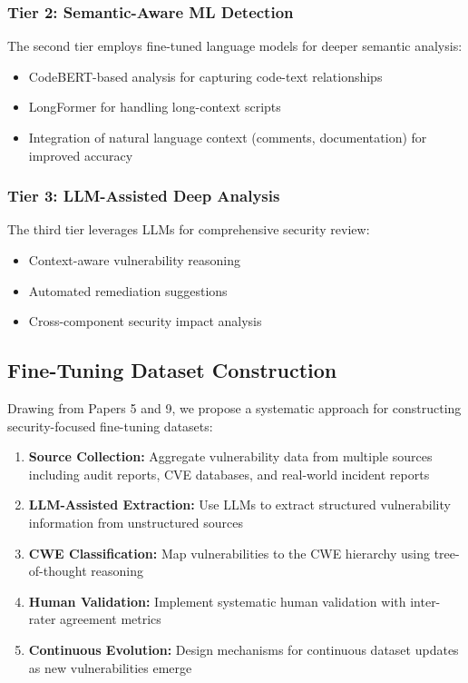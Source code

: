 \documentclass[11pt,a4paper]{article}
\begin{document}
\subsubsection{Tier 2: Semantic-Aware ML Detection}
The second tier employs fine-tuned language models for deeper semantic analysis:
\begin{itemize}
    \item CodeBERT-based analysis for capturing code-text relationships
    \item LongFormer for handling long-context scripts
    \item Integration of natural language context (comments, documentation) for improved accuracy
\end{itemize}

\subsubsection{Tier 3: LLM-Assisted Deep Analysis}
The third tier leverages LLMs for comprehensive security review:
\begin{itemize}
    \item Context-aware vulnerability reasoning
    \item Automated remediation suggestions
    \item Cross-component security impact analysis
\end{itemize}

\subsection{Fine-Tuning Dataset Construction}

Drawing from Papers 5 and 9, we propose a systematic approach for constructing security-focused fine-tuning datasets:

\begin{enumerate}
    \item \textbf{Source Collection:} Aggregate vulnerability data from multiple sources including audit reports, CVE databases, and real-world incident reports
    \item \textbf{LLM-Assisted Extraction:} Use LLMs to extract structured vulnerability information from unstructured sources
    \item \textbf{CWE Classification:} Map vulnerabilities to the CWE hierarchy using tree-of-thought reasoning
    \item \textbf{Human Validation:} Implement systematic human validation with inter-rater agreement metrics
    \item \textbf{Continuous Evolution:} Design mechanisms for continuous dataset updates as new vulnerabilities emerge
\end{enumerate}
\end{document}
